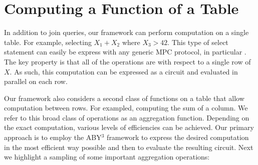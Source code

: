 \section{Computing a Function of a Table}

In addition to join queries, our framework can perform computation on a single table. For example, selecting $X_1+X_2$  where $X_3>42$. This type of select statement can easily be express with any generic MPC protocol, in particular \cite{aby3, highthroughput}. The key property is that all of the operations are with respect to a single row of $X$. As such, this computation can be expressed as a circuit and evaluated in parallel on each row. 

Our framework also considers a second class of functions on a table that allow computation between rows. For exampled, computing the sum of a column. We refer to this broad class of operations as an aggregation function. Depending on the exact computation, various levels of efficiencies can be achieved. Our primary approach is to employ the ABY$^3$ framework \cite{aby3} to express the desired computation in the most efficient way possible and then to evaluate the resulting circuit. Next we highlight a sampling of some important aggregation operations:
